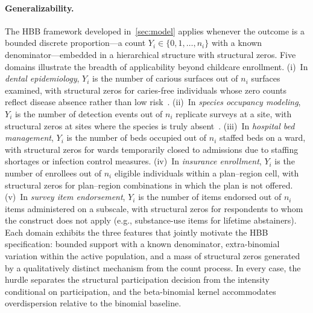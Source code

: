 \paragraph{Generalizability.}
The HBB framework developed in~\cref{sec:model} applies whenever the
outcome is a bounded discrete proportion---a count
$Y_i \in \{0, 1, \ldots, n_i\}$ with a known denominator---embedded
in a hierarchical structure with structural zeros.  Five domains
illustrate the breadth of applicability beyond childcare enrollment.
(i)~In \emph{dental epidemiology}, $Y_i$ is the number of carious
surfaces out of $n_i$ surfaces examined, with structural zeros for
caries-free individuals whose zero counts reflect disease absence
rather than low risk~\citep{BandyopadhyayEtAl2011}.
(ii)~In \emph{species occupancy modeling}, $Y_i$ is the number of
detection events out of $n_i$ replicate surveys at a site, with
structural zeros at sites where the species is truly
absent~\citep{MacKenzieEtAl2002}.
(iii)~In \emph{hospital bed management}, $Y_i$ is the number of beds
occupied out of $n_i$ staffed beds on a ward, with structural zeros
for wards temporarily closed to admissions due to staffing shortages
or infection control measures.
(iv)~In \emph{insurance enrollment}, $Y_i$ is the number of enrollees
out of $n_i$ eligible individuals within a plan--region cell, with
structural zeros for plan--region combinations in which the plan is
not offered.
(v)~In \emph{survey item endorsement}, $Y_i$ is the number of items
endorsed out of $n_i$ items administered on a subscale, with
structural zeros for respondents to whom the construct does not apply
(e.g., substance-use items for lifetime abstainers).
Each domain exhibits the three features that jointly motivate the HBB
specification: bounded support with a known denominator,
extra-binomial variation within the active population, and a mass of
structural zeros generated by a qualitatively distinct mechanism from
the count process.  In every case, the hurdle separates the structural
participation decision from the intensity conditional on
participation, and the beta-binomial kernel accommodates
overdispersion relative to the binomial baseline.

